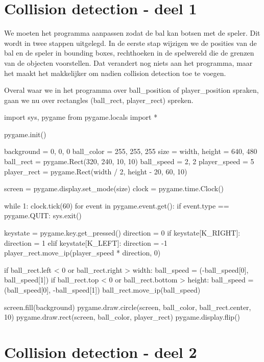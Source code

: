 \documentclass[10pt,a4paper]{article}
\begin{document}
\newpage
\section{Collision detection - deel 1}

We moeten het programma aanpassen zodat de bal kan botsen met de speler. Dit wordt in twee stappen uitgelegd. In de eerste stap wijzigen we de posities van de bal en de speler in bounding boxes, rechthoeken in de spelwereld die de grenzen van de objecten voorstellen. Dat verandert nog niets aan het programma, maar het maakt het makkelijker om nadien collision detection toe te voegen.

Overal waar we in het programma over ball\_position of player\_position spraken, gaan we nu over rectangles (ball\_rect, player\_rect) spreken.

\begin{python}
import sys, pygame
from pygame.locals import *

pygame.init()

background = 0, 0, 0
ball_color = 255, 255, 255
size = width, height = 640, 480
ball_rect = pygame.Rect(320, 240, 10, 10)
ball_speed = 2, 2
player_speed = 5
player_rect = pygame.Rect(width / 2, height - 20, 60, 10)

screen = pygame.display.set_mode(size)
clock = pygame.time.Clock()

while 1:
    clock.tick(60)
    for event in pygame.event.get():
        if event.type == pygame.QUIT: sys.exit()
    
    keystate = pygame.key.get_pressed()
    direction = 0
    if keystate[K_RIGHT]:
        direction = 1
    elif keystate[K_LEFT]:
        direction = -1
    player_rect.move_ip(player_speed * direction, 0)

    if ball_rect.left < 0 or ball_rect.right > width:
        ball_speed = (-ball_speed[0], ball_speed[1])
    if ball_rect.top < 0 or ball_rect.bottom > height:
        ball_speed = (ball_speed[0], -ball_speed[1])
    ball_rect.move_ip(ball_speed)
    
    screen.fill(background)
    pygame.draw.circle(screen, ball_color, ball_rect.center, 10)
    pygame.draw.rect(screen, ball_color, player_rect)
    pygame.display.flip()
\end{python}

\newpage
\section{Collision detection - deel 2}
\end{document}
